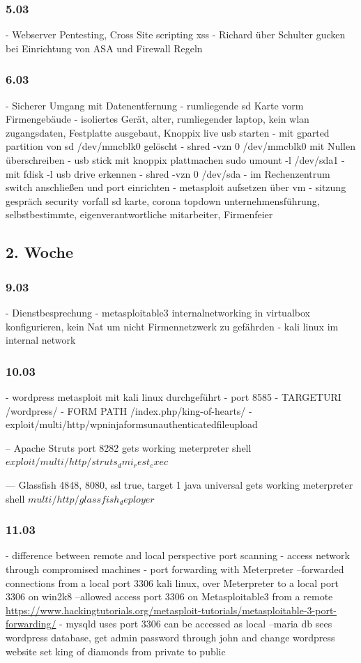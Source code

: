 \documentclass[english,runningheads,a4paper]{llncs}[2018/03/10]
\begin{document}
\subsubsection{5.03}
- Webserver Pentesting, Cross Site scripting xss
- Richard über Schulter gucken bei Einrichtung von ASA und Firewall Regeln

\subsubsection{6.03}
- Sicherer Umgang mit Datenentfernung
- rumliegende sd Karte vorm Firmengebäude 
- isoliertes Gerät, alter, rumliegender laptop, kein wlan zugangsdaten, Festplatte ausgebaut, Knoppix live usb starten
- mit gparted partition von sd /dev/mmcblk0 gelöscht
- shred -vzn 0 /dev/mmcblk0 mit Nullen überschreiben
- usb stick mit knoppix plattmachen sudo umount -l /dev/sda1
- mit fdisk -l usb drive erkennen
- shred -vzn 0 /dev/sda
- im Rechenzentrum switch anschließen und port einrichten
- metasploit aufsetzen über vm
- sitzung gespräch security vorfall sd karte, corona topdown unternehmensführung, selbstbestimmte, eigenverantwortliche mitarbeiter, Firmenfeier
\subsection{2. Woche}
\subsubsection{9.03}
- Dienstbesprechung
- metasploitable3 internalnetworking in virtualbox konfigurieren, kein Nat um nicht Firmennetzwerk zu gefährden
- kali linux im internal network

\subsubsection{10.03}
- wordpress metasploit mit kali linux durchgeführt
- port 8585
- TARGETURI	 /wordpress/
- FORM PATH	/index.php/king-of-hearts/ 
- exploit/multi/http/wpninjaformsunauthenticatedfileupload

-- Apache Struts port 8282 gets working meterpreter shell $exploit/multi/http/struts_dmi_rest_exec$

--- Glassfish 4848, 8080, ssl true, target 1 java universal gets working meterpreter shell
$multi/http/glassfish_deployer$

\subsubsection{11.03}
- difference between remote and local perspective port scanning
- access network through compromised machines
- port forwarding with Meterpreter
--forwarded connections from a local port 3306 kali linux, over Meterpreter to a local port 3306 on win2k8
--allowed access port 3306 on Metasploitable3 from a remote
\url{https://www.hackingtutorials.org/metasploit-tutorials/metasploitable-3-port-forwarding/}
- mysqld uses port 3306 can be accessed as local
--maria db sees wordpress database, get admin password through john and change wordpress website set king of diamonds from private to public
\end{document}
